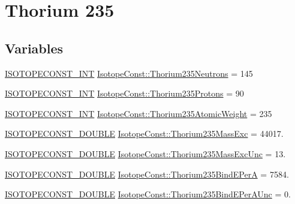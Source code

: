\hypertarget{group___isotope_const-_thorium-_th235}{}\section{Thorium 235}
\label{group___isotope_const-_thorium-_th235}
\subsection*{Variables}
\begin{DoxyCompactItemize}
\item 
\mbox{\hyperlink{group___isotope_const-_macros_ga5f18360b3e99483a35c32d789e62621c}{I\+S\+O\+T\+O\+P\+E\+C\+O\+N\+S\+T\+\_\+\+I\+NT}} \mbox{\hyperlink{group___isotope_const-_thorium-_th235_gafec150897b351690b491cef11074f160}{Isotope\+Const\+::\+Thorium235\+Neutrons}} = 145
\item 
\mbox{\hyperlink{group___isotope_const-_macros_ga5f18360b3e99483a35c32d789e62621c}{I\+S\+O\+T\+O\+P\+E\+C\+O\+N\+S\+T\+\_\+\+I\+NT}} \mbox{\hyperlink{group___isotope_const-_thorium-_th235_ga6480f12da2c4f41f546f9d7603b3b2c7}{Isotope\+Const\+::\+Thorium235\+Protons}} = 90
\item 
\mbox{\hyperlink{group___isotope_const-_macros_ga5f18360b3e99483a35c32d789e62621c}{I\+S\+O\+T\+O\+P\+E\+C\+O\+N\+S\+T\+\_\+\+I\+NT}} \mbox{\hyperlink{group___isotope_const-_thorium-_th235_gada9fdd4f107585b9da6579779fc26ec4}{Isotope\+Const\+::\+Thorium235\+Atomic\+Weight}} = 235
\item 
\mbox{\hyperlink{group___isotope_const-_macros_ga8f45a7272ce02c0b4c65c44636ed719a}{I\+S\+O\+T\+O\+P\+E\+C\+O\+N\+S\+T\+\_\+\+D\+O\+U\+B\+LE}} \mbox{\hyperlink{group___isotope_const-_thorium-_th235_ga83a1e65f8ef3a55f7b146cfc3fc61736}{Isotope\+Const\+::\+Thorium235\+Mass\+Exc}} = 44017.
\item 
\mbox{\hyperlink{group___isotope_const-_macros_ga8f45a7272ce02c0b4c65c44636ed719a}{I\+S\+O\+T\+O\+P\+E\+C\+O\+N\+S\+T\+\_\+\+D\+O\+U\+B\+LE}} \mbox{\hyperlink{group___isotope_const-_thorium-_th235_ga8889cc91646936562753faf5d657ddad}{Isotope\+Const\+::\+Thorium235\+Mass\+Exc\+Unc}} = 13.
\item 
\mbox{\hyperlink{group___isotope_const-_macros_ga8f45a7272ce02c0b4c65c44636ed719a}{I\+S\+O\+T\+O\+P\+E\+C\+O\+N\+S\+T\+\_\+\+D\+O\+U\+B\+LE}} \mbox{\hyperlink{group___isotope_const-_thorium-_th235_ga5f6798b1a04c4790db4259e4265233fc}{Isotope\+Const\+::\+Thorium235\+Bind\+E\+PerA}} = 7584.
\item 
\mbox{\hyperlink{group___isotope_const-_macros_ga8f45a7272ce02c0b4c65c44636ed719a}{I\+S\+O\+T\+O\+P\+E\+C\+O\+N\+S\+T\+\_\+\+D\+O\+U\+B\+LE}} \mbox{\hyperlink{group___isotope_const-_thorium-_th235_gae0203fd97b49b4a26175452c809f45a3}{Isotope\+Const\+::\+Thorium235\+Bind\+E\+Per\+A\+Unc}} = 0.

\end{DoxyCompactItemize}
